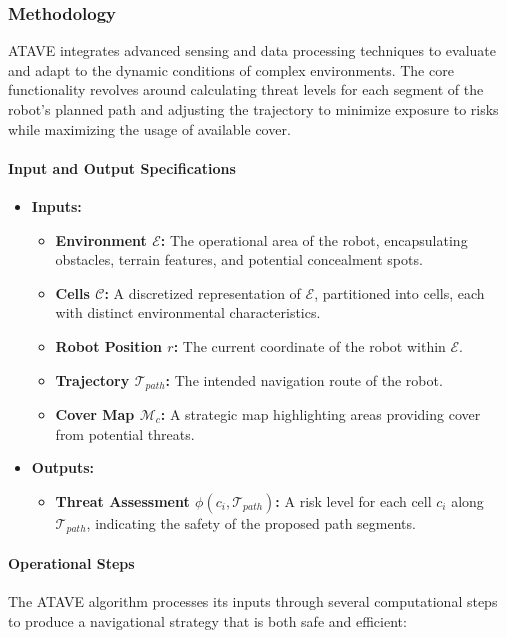 \subsubsection{Methodology}

ATAVE integrates advanced sensing and data processing techniques to evaluate and adapt to the dynamic conditions of complex environments. The core functionality revolves around calculating threat levels for each segment of the robot's planned path and adjusting the trajectory to minimize exposure to risks while maximizing the usage of available cover.

\paragraph{Input and Output Specifications}
\begin{itemize}
    \item \textbf{Inputs:}
    \begin{itemize}
        \item \textbf{Environment $\mathcal{E}$:} The operational area of the robot, encapsulating obstacles, terrain features, and potential concealment spots.
        \item \textbf{Cells $\mathcal{C}$:} A discretized representation of $\mathcal{E}$, partitioned into cells, each with distinct environmental characteristics.
        \item \textbf{Robot Position $r$:} The current coordinate of the robot within $\mathcal{E}$.
        \item \textbf{Trajectory $\mathcal{T}_{path}$:} The intended navigation route of the robot.
        \item \textbf{Cover Map $\mathcal{M}_c$:} A strategic map highlighting areas providing cover from potential threats.
    \end{itemize}
    \item \textbf{Outputs:}
    \begin{itemize}
        \item \textbf{Threat Assessment $\phi(c_i, \mathcal{T}_{path})$:} A risk level for each cell $c_i$ along $\mathcal{T}_{path}$, indicating the safety of the proposed path segments.
    \end{itemize}
\end{itemize}

\paragraph{Operational Steps}
The ATAVE algorithm processes its inputs through several computational steps to produce a navigational strategy that is both safe and efficient:

